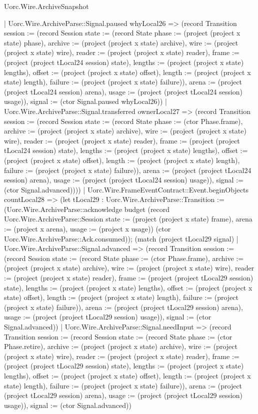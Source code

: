 \begin{lexlean}{Uorc.Wire.ArchiveSnapshot}
\begin{semanticmodule}
{        | Uorc.Wire.ArchiveParse::Signal.paused whyLocal26 => (record Transition {session := (record Session {state := (record State {phase := (project (project x state) phase), archive := (project (project x state) archive), wire := (project (project x state) wire), reader := (project (project x state) reader), frame := (project (project tLocal24 session) state), lengths := (project (project x state) lengths), offset := (project (project x state) offset), length := (project (project x state) length), failure := (project (project x state) failure)}), arena := (project (project tLocal24 session) arena), usage := (project (project tLocal24 session) usage)}), signal := (ctor Signal.paused whyLocal26)})
        | Uorc.Wire.ArchiveParse::Signal.transferred ownerLocal27 => (record Transition {session := (record Session {state := (record State {phase := (ctor Phase.frame), archive := (project (project x state) archive), wire := (project (project x state) wire), reader := (project (project x state) reader), frame := (project (project tLocal24 session) state), lengths := (project (project x state) lengths), offset := (project (project x state) offset), length := (project (project x state) length), failure := (project (project x state) failure)}), arena := (project (project tLocal24 session) arena), usage := (project (project tLocal24 session) usage)}), signal := (ctor Signal.advanced)})))
      | Uorc.Wire.FrameEventContract::Event.beginObjects countLocal28 => (let tLocal29 : Uorc.Wire.ArchiveParse::Transition := (Uorc.Wire.ArchiveParse::acknowledge budget (record Uorc.Wire.ArchiveParse::Session {state := (project (project x state) frame), arena := (project x arena), usage := (project x usage)}) (ctor Uorc.Wire.ArchiveParse::Ack.consumed)); (match (project tLocal29 signal)
        | Uorc.Wire.ArchiveParse::Signal.advanced => (record Transition {session := (record Session {state := (record State {phase := (ctor Phase.frame), archive := (project (project x state) archive), wire := (project (project x state) wire), reader := (project (project x state) reader), frame := (project (project tLocal29 session) state), lengths := (project (project x state) lengths), offset := (project (project x state) offset), length := (project (project x state) length), failure := (project (project x state) failure)}), arena := (project (project tLocal29 session) arena), usage := (project (project tLocal29 session) usage)}), signal := (ctor Signal.advanced)})
        | Uorc.Wire.ArchiveParse::Signal.needInput => (record Transition {session := (record Session {state := (record State {phase := (ctor Phase.retire), archive := (project (project x state) archive), wire := (project (project x state) wire), reader := (project (project x state) reader), frame := (project (project tLocal29 session) state), lengths := (project (project x state) lengths), offset := (project (project x state) offset), length := (project (project x state) length), failure := (project (project x state) failure)}), arena := (project (project tLocal29 session) arena), usage := (project (project tLocal29 session) usage)}), signal := (ctor Signal.advanced)})
}
\end{semanticmodule}
\end{lexlean}
